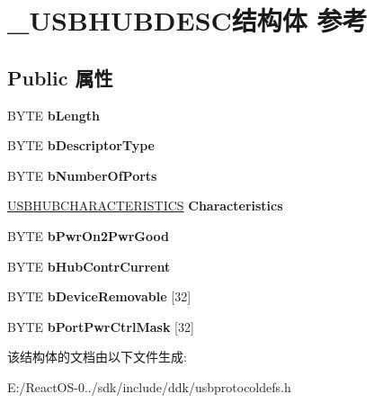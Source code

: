 \hypertarget{struct___u_s_b_h_u_b_d_e_s_c}{}\section{\+\_\+\+U\+S\+B\+H\+U\+B\+D\+E\+S\+C结构体 参考}
\label{struct___u_s_b_h_u_b_d_e_s_c}
\subsection*{Public 属性}
\begin{DoxyCompactItemize}
\item 
\mbox{\label{struct___u_s_b_h_u_b_d_e_s_c_aeca444b084441ffc9964687e3e25da84}} 
B\+Y\+TE {\bfseries b\+Length}
\item 
\mbox{\label{struct___u_s_b_h_u_b_d_e_s_c_a3afe5121b83445600bd0fd66a5385d40}} 
B\+Y\+TE {\bfseries b\+Descriptor\+Type}
\item 
\mbox{\label{struct___u_s_b_h_u_b_d_e_s_c_a035a3313101d5fdfbde8e60c0b4d66c3}} 
B\+Y\+TE {\bfseries b\+Number\+Of\+Ports}
\item 
\mbox{\label{struct___u_s_b_h_u_b_d_e_s_c_ac99f2d075175f1b37e77ec36de0536ae}} 
\hyperlink{union___u_s_b_h_u_b_c_h_a_r_a_c_t_e_r_i_s_t_i_c_s}{U\+S\+B\+H\+U\+B\+C\+H\+A\+R\+A\+C\+T\+E\+R\+I\+S\+T\+I\+CS} {\bfseries Characteristics}
\item 
\mbox{\label{struct___u_s_b_h_u_b_d_e_s_c_a1dbfe9e116818f2d43cef18ce31ae40c}} 
B\+Y\+TE {\bfseries b\+Pwr\+On2\+Pwr\+Good}
\item 
\mbox{\label{struct___u_s_b_h_u_b_d_e_s_c_a3b140d4b2b7431d56509b0dd3a200544}} 
B\+Y\+TE {\bfseries b\+Hub\+Contr\+Current}
\item 
\mbox{\label{struct___u_s_b_h_u_b_d_e_s_c_a107b124bbe51b057f3d901bc4927d338}} 
B\+Y\+TE {\bfseries b\+Device\+Removable} \mbox{[}32\mbox{]}
\item 
\mbox{\label{struct___u_s_b_h_u_b_d_e_s_c_af5a9003bb076a7a306f7a683b1232e94}} 
B\+Y\+TE {\bfseries b\+Port\+Pwr\+Ctrl\+Mask} \mbox{[}32\mbox{]}
\end{DoxyCompactItemize}


该结构体的文档由以下文件生成\+:\begin{DoxyCompactItemize}
\item 
E\+:/\+React\+O\+S-\/0../sdk/include/ddk/usbprotocoldefs.\+h\end{DoxyCompactItemize}
